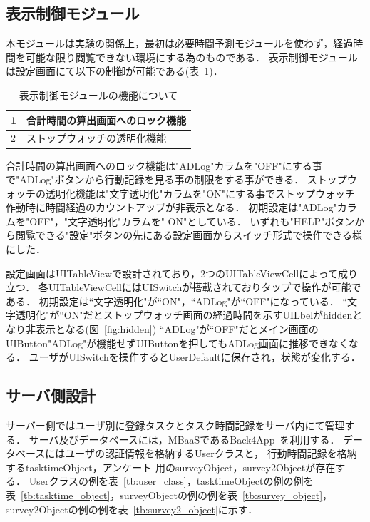\subsection{表示制御モジュール}
本モジュールは実験の関係上，最初は必要時間予測モジュールを使わず，経過時間を可能な限り閲覧できない環境にする為のものである．
表示制御モジュールは設定画面にて以下の制御が可能である(表~\ref{tb:hyoji})．
\begin{table}[htb]
\begin{center}
  \caption{表示制御モジュールの機能について}
  \begin{tabular}{|l|l|} \hline
   1 & 合計時間の算出画面へのロック機能 \\ \hline
   2 & ストップウォッチの透明化機能 \\ \hline
  \end{tabular}
  \label{tb:hyoji}
\end{center}
\end{table}
合計時間の算出画面へのロック機能は"ADLog"カラムを"OFF"にする事で"ADLog"ボタンから行動記録を見る事の制限をする事ができる．
ストップウォッチの透明化機能は"文字透明化"カラムを"ON"にする事でストップウォッチ作動時に時間経過のカウントアップが非表示となる．
初期設定は"ADLog"カラムを"OFF"，"文字透明化"カラムを" ON"としている．
いずれも"HELP"ボタンから閲覧できる"設定"ボタンの先にある設定画面からスイッチ形式で操作できる様にした．

設定画面はUITableViewで設計されており，2つのUITableViewCellによって成り立つ．
各UITableViewCellにはUISwitchが搭載されておりタップで操作が可能である．
初期設定は``文字透明化"が``ON"，``ADLog"が``OFF"になっている．
``文字透明化"が``ON"だとストップウォッチ画面の経過時間を示すUILbelがhiddenとなり非表示となる(図~\ref{fig:hidden})
``ADLog"が``OFF"だとメイン画面のUIButton"ADLog"が機能せずUIButtonを押してもADLog画面に推移できなくなる．
ユーザがUISwitchを操作するとUserDefaultに保存され，状態が変化する．

\subsection{サーバ側設計}
サーバー側ではユーザ別に登録タスクとタスク時間記録をサーバ内にて管理する．
サーバ及びデータベースには，MBaaSであるBack4App~\cite{back4app}を利用する．
データベースにはユーザの認証情報を格納するUserクラスと， 行動時間記録を格納するtasktimeObject，アンケート 用のsurveyObject，survey2Objectが存在する．
Userクラスの例を表~\ref{tb:user_class}，tasktimeObjectの例の例を表~\ref{tb:tasktime_object}，surveyObjectの例の例を表~\ref{tb:survey_object}，survey2Objectの例の例を表~\ref{tb:survey2_object}に示す．

